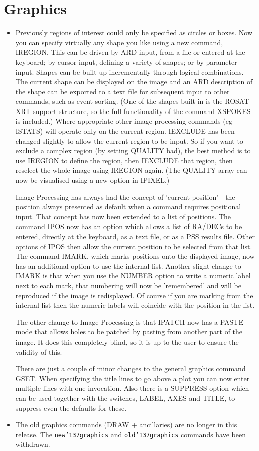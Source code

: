 \documentclass{book}
\renewcommand{\_}{{\tt\char'137}}     %
\begin{document}
\section{Graphics}
\begin{itemize}
\item Previously regions of interest could only be specified as circles
or boxes. Now you can specify virtually any shape you like
using a new command, IREGION. This can be driven by ARD input, from
a file or entered at the keyboard; by cursor input, defining a
variety of shapes; or by parameter input. Shapes can be built up
incrementally through logical combinations. The current shape can be
displayed on the image and an ARD description of the shape can be
exported to a text file for subsequent input to other commands, such
as event sorting. (One of the shapes built in is the ROSAT XRT
support structure, so the full functionality of the command XSPOKES
is included.) Where appropriate other image processing commands
(eg ISTATS) will operate only on the current region. IEXCLUDE has
been changed slightly to allow the current region to be input. So
if you want to exclude a complex region (by setting QUALITY bad), the
best method is to use IREGION to define the region, then IEXCLUDE
that region, then reselect the whole image using IREGION again.
(The QUALITY array can now be visualised using a new option in
IPIXEL.)

Image Processing has always had the concept of 'current position' - the
position always presented as default when a command requires positional
input. That concept has now been extended to a list of positions.
The command IPOS now has an option which allows a list of RA/DECs to
be entered, directly at the keyboard, as a text file, or as a PSS
results file. Other options of IPOS then allow the current position
to be selected from that list. The command IMARK, which marks positions
onto the displayed image, now has an additional option to use the
internal list. Another slight change to IMARK is that when you use
the NUMBER option to write a numeric label next to each mark, that
numbering will now be 'remembered' and will be reproduced if the image
is redisplayed. Of course if you are marking from the internal list
then the numeric labels will coincide with the position in the list.

The other change to Image Processing is that IPATCH now has a PASTE
mode that allows holes to be patched by pasting from another part of
the image. It does this completely blind, so it is up to the user
to ensure the validity of this.

There are just a couple of minor changes to the general graphics
command GSET. When specifying the title lines to go above a plot
you can now enter multiple lines with one invocation. Also there
is a SUPPRESS option which can be used together with the switches,
LABEL, AXES and TITLE, to suppress even the defaults for these.

\item The old graphics commands (DRAW + ancillaries) are no longer in this
release. The {\tt new\_graphics} and {\tt old\_graphics}
commands have been withdrawn.

\end{itemize}
\end{document}
